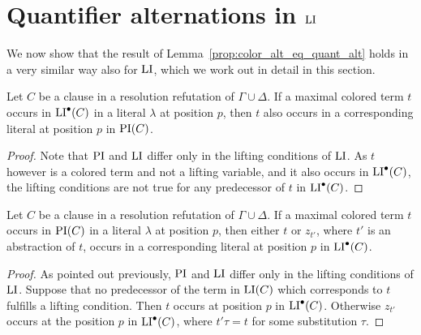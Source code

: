 \documentclass[%
	draft=false,%
	numbers=noendperiod,%
	11pt,%
	a4paper,%
	oneside,%
	openany,%
]{memoir}
\begin{document}
\section{Quantifier alternations in $\operatorname{LI}$}

We now show that the result of Lemma~\ref{prop:color_alt_eq_quant_alt} holds in a very similar way also for $\operatorname{LI}$,
which we work out in detail in this section.

\begin{clemma}
	\label{lemma:pi_li_1}
	Let $C$ be a clause in a resolution refutation of $\Gamma \cup \Delta$.
	If a maximal colored term $t$ occurs in $\operatorname{LI}^\bullet(C)$ in a literal $\lambda$ at position $p$, 
	then $t$ also occurs in a corresponding literal at position $p$ in $\operatorname{PI}(C)$.
\end{clemma}
\begin{proof}
	Note that $\operatorname{PI}$ and $\operatorname{LI}$ differ only in the lifting conditions of $\operatorname{LI}$.
	As $t$ however is a colored term and not a lifting variable, and it also occurs in $\operatorname{LI}^\bullet(C)$, the lifting conditions are not true for any predecessor of $t$ in $\operatorname{LI}^\bullet(C)$.
\end{proof}

\begin{clemma}
	\label{lemma:pi_li_2}
	Let $C$ be a clause in a resolution refutation of $\Gamma \cup \Delta$.
	If a maximal colored term $t$ occurs in $\operatorname{PI}(C)$ in a literal $\lambda$ at position $p$, 
	then either $t$ or $z_{t'}$, where $t'$ is an abstraction of $t$, occurs in a corresponding literal at position $p$ in $\operatorname{LI}^\bullet(C)$.
\end{clemma}
\begin{proof}
	As pointed out previously, $\operatorname{PI}$ and $\operatorname{LI}$ differ only in the lifting conditions of $\operatorname{LI}$.
	Suppose that no predecessor of the term in $\operatorname{LI}(C)$ which corresponds to $t$  fulfills a lifting condition.
	Then $t$ occurs at position $p$ in $\operatorname{LI}^\bullet(C)$.
	Otherwise $z_{t'}$ occurs at the position $p$ in $\operatorname{LI}^\bullet(C)$, where $t'\tau = t$ for some substitution\nolinebreak{} $\tau$.
\end{proof}
\end{document}
